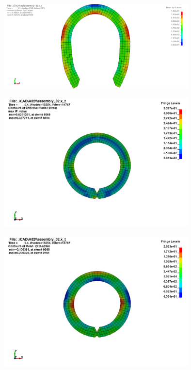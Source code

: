 \begin{center}
\includegraphics[width=0.75\textwidth]{src/ch4/strain_y_01.png}
\label{fig:efective_plastic_strain}
\end{center}


\begin{center}
\includegraphics[width=0.75\textwidth]{src/ch4/efective_plastic_strain_02.png}
\label{fig:efective_plastic_strain}
\end{center}

\begin{center}
\includegraphics[width=0.75\textwidth]{src/ch4/strain_x_02.png}
\label{fig:efective_plastic_strain}
\end{center}

